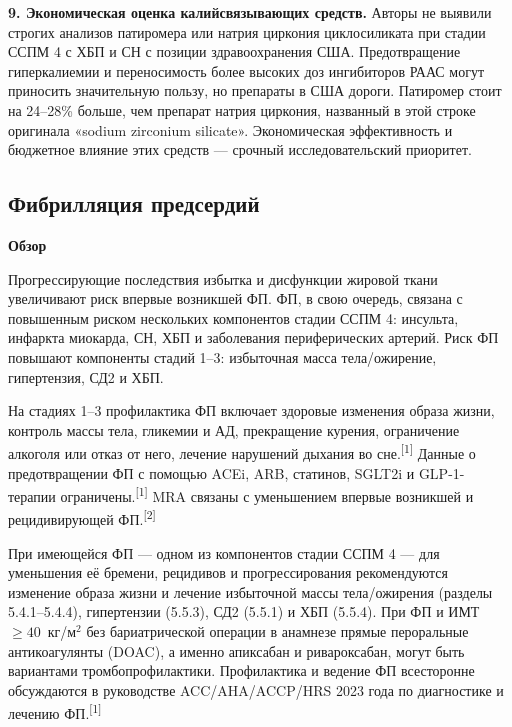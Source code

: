 \documentclass[11pt,a4paper]{article}
\newcommand{\src}[1]{\textsuperscript{[#1]}}
\newcommand{\heading}[1]{\par\medskip\textbf{#1}\par}
\begin{document}
\textbf{9. Экономическая оценка калийсвязывающих средств.} Авторы не выявили строгих анализов патиромера или натрия циркония циклосиликата при стадии ССПМ 4 с ХБП и СН с позиции здравоохранения США. Предотвращение гиперкалиемии и переносимость более высоких доз ингибиторов РААС могут приносить значительную пользу, но препараты в США дороги. Патиромер стоит на 24--28\% больше, чем препарат натрия циркония, названный в этой строке оригинала «sodium zirconium silicate». Экономическая эффективность и бюджетное влияние этих средств --- срочный исследовательский приоритет.

\subsection{Фибрилляция предсердий}
\heading{Обзор}
Прогрессирующие последствия избытка и дисфункции жировой ткани увеличивают риск впервые возникшей ФП. ФП, в свою очередь, связана с повышенным риском нескольких компонентов стадии ССПМ 4: инсульта, инфаркта миокарда, СН, ХБП и заболевания периферических артерий. Риск ФП повышают компоненты стадий 1--3: избыточная масса тела/ожирение, гипертензия, СД2 и ХБП.

На стадиях 1--3 профилактика ФП включает здоровые изменения образа жизни, контроль массы тела, гликемии и АД, прекращение курения, ограничение алкоголя или отказ от него, лечение нарушений дыхания во сне.\src{1} Данные о предотвращении ФП с помощью ACEi, ARB, статинов, SGLT2i и GLP-1-терапии ограничены.\src{1} MRA связаны с уменьшением впервые возникшей и рецидивирующей ФП.\src{2}

При имеющейся ФП --- одном из компонентов стадии ССПМ 4 --- для уменьшения её бремени, рецидивов и прогрессирования рекомендуются изменение образа жизни и лечение избыточной массы тела/ожирения (разделы 5.4.1--5.4.4), гипертензии (5.5.3), СД2 (5.5.1) и ХБП (5.5.4). При ФП и ИМТ $\geq40$~кг/м$^2$ без бариатрической операции в анамнезе прямые пероральные антикоагулянты (DOAC), а именно апиксабан и ривароксабан, могут быть вариантами тромбопрофилактики. Профилактика и ведение ФП всесторонне обсуждаются в руководстве ACC/AHA/ACCP/HRS 2023 года по диагностике и лечению ФП.\src{1}
\end{document}
